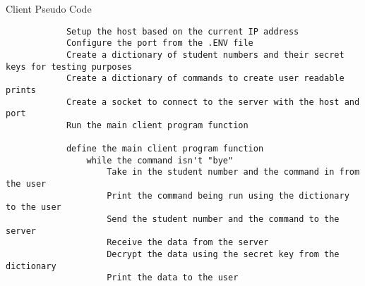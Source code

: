 \documentclass[titlepage]{article}
\begin{document}
    \begin{section}{Client Pseudo Code}
        \begin{verbatim}
            Setup the host based on the current IP address
            Configure the port from the .ENV file
            Create a dictionary of student numbers and their secret keys for testing purposes
            Create a dictionary of commands to create user readable prints
            Create a socket to connect to the server with the host and port
            Run the main client program function

            define the main client program function
                while the command isn't "bye"
                    Take in the student number and the command in from the user
                    Print the command being run using the dictionary to the user
                    Send the student number and the command to the server
                    Receive the data from the server
                    Decrypt the data using the secret key from the dictionary
                    Print the data to the user
        \end{verbatim}
    \end{section}
\end{document}
